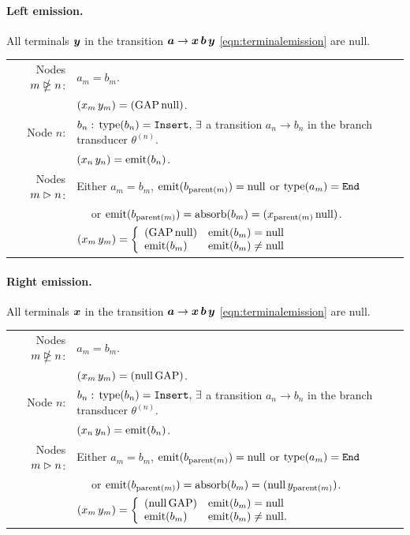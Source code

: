 \documentclass[10pt]{article}
\begin{document}
\paragraph{Left emission.}
All terminals $\boldsymbol{y}$ in the transition $\boldsymbol{a} \to \boldsymbol{x}\,\boldsymbol{b}\,\boldsymbol{y}$ \eqref{eqn:terminalemission} are null.

\begin{tabular}{rl}
  Nodes $m \ntrianglerighteq n$: & $a_m = b_m$. \\
  & $(x_m\,y_m) = (\mathrm{GAP}\,\mathrm{null})$. \\
  Node $n$: & $b_n:\,\operatorname{type}(b_n) = \mathtt{Insert},\,\exists$ a transition $a_n \to b_n$ in the branch transducer $\theta^{(n)}$. \\
  & $(x_n\,y_n) = \operatorname{emit}(b_n)$. \\
  Nodes $m \vartriangleright n$: & Either $a_m = b_m$, $\operatorname{emit}(b_{\operatorname{parent}(m)}) = \mathrm{null}$ or $\operatorname{type}(a_m) = \mathtt{End}$ \\
  & $\quad$ or $\operatorname{emit}(b_{\operatorname{parent}(m)}) = \operatorname{absorb}(b_m) = (x_{\operatorname{parent}(m)}\,\mathrm{null})$. \\
  & $(x_m\,y_m) = \left\{ \begin{array}{ll} (\mathrm{GAP}\,\mathrm{null}) & \operatorname{emit}(b_m) = \mathrm{null} \\ \operatorname{emit}(b_m) & \operatorname{emit}(b_m) \ne \mathrm{null} \end{array} \right. $
\end{tabular}

\paragraph{Right emission.}
All terminals $\boldsymbol{x}$ in the transition $\boldsymbol{a} \to \boldsymbol{x}\,\boldsymbol{b}\,\boldsymbol{y}$ \eqref{eqn:terminalemission} are null.

\begin{tabular}{rl}
  Nodes $m \ntrianglerighteq n$: & $a_m = b_m$. \\
  & $(x_m\,y_m) = (\mathrm{null}\,\mathrm{GAP})$. \\
  Node $n$: & $b_n:\,\operatorname{type}(b_n) = \mathtt{Insert},\,\exists$ a transition $a_n \to b_n$ in the branch transducer $\theta^{(n)}$. \\
  & $(x_n\,y_n) = \operatorname{emit}(b_n)$. \\
  Nodes $m \vartriangleright n$: & Either $a_m = b_m$, $\operatorname{emit}(b_{\operatorname{parent}(m)}) = \mathrm{null}$ or $\operatorname{type}(a_m) = \mathtt{End}$ \\
  & $\quad$ or $\operatorname{emit}(b_{\operatorname{parent}(m)}) = \operatorname{absorb}(b_m) = (\mathrm{null}\,y_{\operatorname{parent}(m)})$. \\
  & $(x_m\,y_m) = \left\{ \begin{array}{ll} (\mathrm{null}\,\mathrm{GAP}) & \operatorname{emit}(b_m) = \mathrm{null} \\ \operatorname{emit}(b_m) & \operatorname{emit}(b_m) \ne \mathrm{null} . \end{array} \right. $
\end{tabular}
\end{document}
